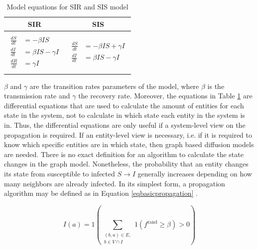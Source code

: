 \begin{table}[ht!]
    \centering
    \begin{tabular}{|c | c |} 
     \hline
     SIR & SIS  \\ 
     \hline
     & \\
     $\begin{aligned}
          \frac{dS}{dt} &= -\beta I S \\
          \frac{dI}{dt} &= \beta I S - \gamma I \\
          \frac{dR}{dt} &= \gamma I  
        \end{aligned}$
      &
      $\begin{aligned}
          \frac{dS}{dt} &= -\beta I S + \gamma I\\
          \frac{dI}{dt} &= \beta I S - \gamma I
        \end{aligned}$
       \\ 
       & \\
     \hline
    \end{tabular}
    \caption{Model equations for SIR and SIS model \cite{sirequation}}
    \label{SI-table-equations}
\end{table}

$\beta$ and $\gamma$ are the transition rates parameters of the model, where 
$\beta$ is the transmission rate and $\gamma$ the 
recovery rate. Moreover, the equations in Table \ref{SI-table-equations}
are differential equations that are used to calculate the amount
of entities for each state in the system, not to calculate in which state
each entity in the system is in. Thus, the differential equations are 
only useful if a system-level view on the propagation is required.
If an entity-level view is necessary, i.e. if it is required to know which 
specific entities are in which state, then graph based diffusion models are needed.
There is no exact definition for an algorithm to calculate the state changes in the
graph model. Nonetheless, the probability that an entity changes
its state from susceptible to infected $S \to I$ generally increases depending on
how many neighbors are already infected. In its simplest form, a
propagation algorithm may be defined as in Equation \ref{eqbasicpropagation} 
\cite{easypropagation}.

\begin{equation}
    I(a) = 1 (\sum\limits_{\substack{(b,a)\in E, \\ b \in V \cap I}}
    1(f^{\mathrm{rand}}\geq \beta)>0) 
    \label{eqbasicpropagation}
\end{equation}

